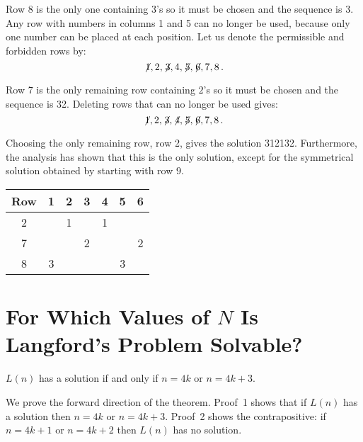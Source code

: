 Row 8 is the only one containing $3$'s so it must be chosen and the sequence is 3\textvisiblespace \textvisiblespace {}\textvisiblespace. Any row with numbers in columns 1 and 5 can no longer be used, because only one number can be placed at each position. Let us denote the permissible and forbidden rows by:
\[\not\! 1,2,\not\! 3,4,\not\! 5, \not\! 6, 7, 8\,.\]

Row 7 is the only remaining row containing $2$'s so it must be chosen and the sequence is 32. Deleting rows that can no longer be used gives:
\[\not\! 1,2,\not\! 3,\not\! 4,\not\! 5, \not\! 6, 7, 8\,.\]

Choosing the only remaining row, row 2, gives the solution 3{}1{}2{}1{}3{}2. Furthermore, the analysis has shown that this is the only solution, except for the symmetrical solution obtained by starting with row 9.
\begin{center}
\addtolength{\tabcolsep}{1mm}
\begin{tabular}{|c||c|c|c|c|c|c|}
\hline
Row&1&2&3&4&5&6\\\hline\hline
2&&1&&1&&\\\hline
7&&&2&&&2\\\hline
8&3&&&&3&\\\hline
\end{tabular}
\end{center}

\section{For Which Values of $N$ Is Langford's Problem Solvable?}\label{s.langford-theorem}

\begin{theorem} \label{thm.langford}
$L(n)$ has a solution if and only if $n=4k$ or $n=4k+3$.
\end{theorem}

We prove the forward direction of the theorem. Proof~1 shows that if $L(n)$ has a solution then $n=4k$ or $n=4k+3$. Proof~2 shows the contrapositive: if $n=4k+1$ or $n=4k+2$ then $L(n)$ has no solution.


